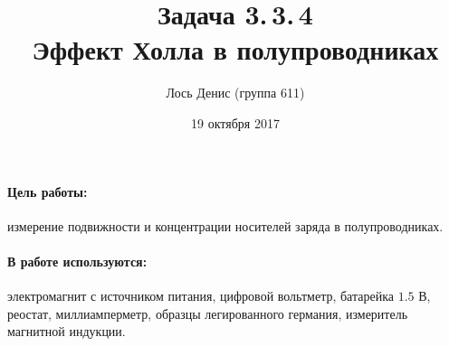 \documentclass[12pt]{article}
\title{{\bf Задача 3.\,3.\,4 \\ Эффект Холла в полупроводниках}}
\author{Лось Денис (группа 611)}
\date{19 октября 2017}
\begin{document}
\maketitle

\paragraph{Цель работы:} измерение подвижности и концентрации носителей заряда в полупроводниках.

\paragraph{В работе используются:} электромагнит с источником питания, цифровой вольтметр, батарейка $1.5$ В, реостат, миллиамперметр, образцы легированного германия, измеритель магнитной индукции. 
\end{document}
